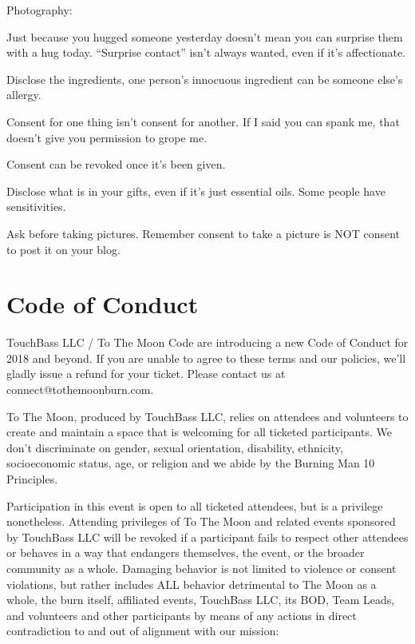 \begin{labeling}{Photography:}
	\item[Touch:] Just because you hugged someone yesterday doesn't mean you can surprise them with a hug today. ``Surprise contact'' isn't always wanted, even if it's affectionate.
	\item[Foods:] Disclose the ingredients, one person's innocuous ingredient can be someone else's allergy.
	\item[Kink:] Consent for one thing isn't consent for another. If I said you can spank me, that doesn't give you permission to grope me.
	\item[Sex:] Consent can be revoked once it's been given.
	\item[Gifts:] Disclose what is in your gifts, even if it's just essential oils. Some people have sensitivities.
	\item[Photography:] Ask before taking pictures. Remember consent to take a picture is NOT consent to post it on your blog.
\end{labeling}


\section*{Code of Conduct}
\label{coc}
TouchBass LLC / To The Moon Code are introducing a new Code of Conduct for 2018 and beyond.
If you are unable to agree to these terms and our policies, we’ll gladly issue a refund for your ticket.
Please contact us at connect@tothemoonburn.com. 


To The Moon, produced by TouchBass LLC, relies on attendees and volunteers to create and maintain a space that is welcoming for all ticketed participants. We don’t discriminate on gender, sexual orientation, disability, ethnicity, socioeconomic status, age, or religion and we abide by the Burning Man 10 Principles.

Participation in this event is open to all ticketed attendees, but is a privilege nonetheless. Attending privileges of To The Moon and related events sponsored by TouchBass LLC will be revoked if a participant fails to respect other attendees or behaves in a way that endangers themselves, the event, or the broader community as a whole.
Damaging behavior is not limited to violence or consent violations, but rather includes ALL behavior detrimental to The Moon as a whole, the burn itself, affiliated events, TouchBass LLC, its BOD, Team Leads, and volunteers and other participants by means of any actions in direct contradiction to and out of alignment with our mission:

